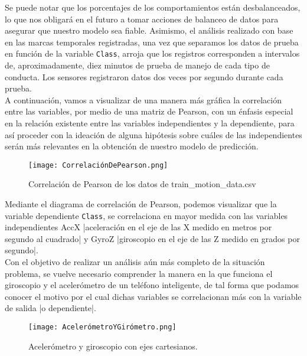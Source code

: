 \documentclass[spanish,12pt,letterpaper]{article}
\begin{document}
Se puede notar que los porcentajes de los comportamientos están desbalanceados, lo que nos obligará en el futuro a tomar acciones de balanceo de datos para asegurar que nuestro modelo sea fiable. Asimismo, el análisis realizado con base en las marcas temporales registradas, una vez que separamos los datos de prueba en función de la variable \verb|Class|, arroja que los registros corresponden a intervalos de, aproximadamente, diez minutos de prueba de manejo de cada tipo de conducta. Los sensores registraron datos dos veces por segundo durante cada prueba. \\

\textsc A continuación, vamos a visualizar de una manera más gráfica la correlación entre las variables, por medio de una matriz de Pearson, con un énfasis especial en la relación existente entre las variables independientes y la dependiente, para así proceder con la ideación de alguna hipótesis sobre cuáles de las independientes serán más relevantes en la obtención de nuestro modelo de predicción. \\

    \begin{figure}[htb]
        \centering
        \texttt{[image: CorrelaciónDePearson.png]}
        \caption{Correlación de Pearson de los datos de train\_motion\_data.csv}
        \label{fig:comand}%
    \end{figure}

\textsc Mediante el diagrama de correlación de Pearson, podemos visualizar que la variable dependiente \verb|Class|, se correlaciona en mayor medida con las variables independientes AccX |aceleración en el eje de las X medido en metros por segundo al cuadrado| y GyroZ |giroscopio en el eje de las Z medido en grados por segundo|. \\

\textsc Con el objetivo de realizar un análisis aún más completo de la situación problema, se vuelve necesario comprender la manera en la que funciona el giroscopio y el acelerómetro de un teléfono inteligente, de tal forma que podamos conocer el motivo por el cual dichas variables se correlacionan más con la variable de salida |o dependiente|. \\

    \begin{figure}[htb]
        \centering
        \texttt{[image: AcelerómetroYGirómetro.png]}
        \caption{Acelerómetro y giroscopio con ejes cartesianos.}
        \label{fig:comand}%
    \end{figure}
\end{document}
